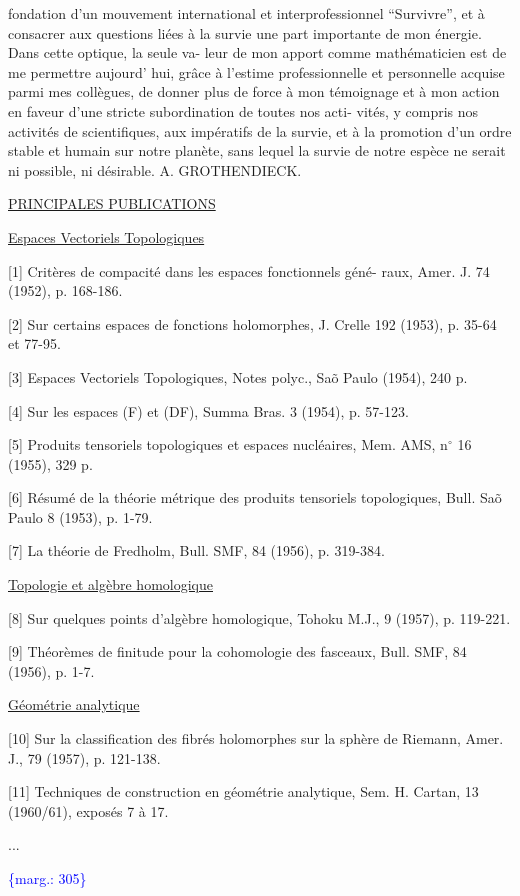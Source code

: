 \documentclass[11pt]{article}
\newcommand{\scanpage}[1]{\par\bigskip\noindent{\small\sffamily[scan #1]}\par}
\newcommand{\mspage}[1]{{\small\sffamily[p.\,#1]}}
\newcommand{\margin}[1]{\textcolor{blue}{\{\textsf{marg.:} #1\}}}
\newcommand{\uline}[1]{\underline{#1}}
\begin{document}
fondation d'un mouvement international et interprofessionnel
``Survivre'', et à consacrer aux questions liées à la survie une
part importante de mon énergie. Dans cette optique, la seule va-%
leur de mon apport comme mathématicien est de me permettre aujourd'%
hui, grâce à l'estime professionnelle et personnelle acquise parmi
mes collègues, de donner plus de force à mon témoignage et à mon
action en faveur d'une stricte subordination de toutes nos acti-%
vités, y compris nos activités de scientifiques, aux impératifs
de la survie, et à la promotion d'un ordre stable et humain sur
notre planète, sans lequel la survie de notre espèce ne serait
ni possible, ni désirable.
A. GROTHENDIECK.

\uline{PRINCIPALES PUBLICATIONS}

\uline{Espaces Vectoriels Topologiques}

[1] Critères de compacité dans les espaces fonctionnels géné-%
raux, Amer. J. 74 (1952), p. 168-186.

[2] Sur certains espaces de fonctions holomorphes, J. Crelle
192 (1953), p. 35-64 et 77-95.

[3] Espaces Vectoriels Topologiques, Notes polyc., Sa\~o Paulo
(1954), 240 p.

[4] Sur les espaces (F) et (DF), Summa Bras. 3 (1954),
p. 57-123.

[5] Produits tensoriels topologiques et espaces nucléaires,
Mem. AMS, n$^\circ$ 16 (1955), 329 p.

[6] Résumé de la théorie métrique des produits tensoriels
topologiques, Bull. Sa\~o Paulo 8 (1953), p. 1-79.

[7] La théorie de Fredholm, Bull. SMF, 84 (1956), p. 319-384.

\uline{Topologie et algèbre homologique}

[8] Sur quelques points d'algèbre homologique, Tohoku M.J.,
9 (1957), p. 119-221.

[9] Théorèmes de finitude pour la cohomologie des fasceaux,
Bull. SMF, 84 (1956), p. 1-7.

\uline{Géométrie analytique}

[10] Sur la classification des fibrés holomorphes sur la
sphère de Riemann, Amer. J., 79 (1957), p. 121-138.

[11] Techniques de construction en géométrie analytique,
Sem. H. Cartan, 13 (1960/61), exposés 7 à 17.

...

\margin{305}

\clearpage
\scanpage{119/306}
\mspage{-4-}
\end{document}
